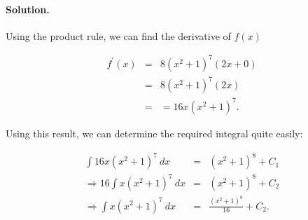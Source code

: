 
\paragraph{Solution.}

Using the product rule, we can find the derivative of $f\left(x\right)$

\begin{eqnarray*}
	f^\prime\left(x\right)&=&8\left(x^2+1\right)^7\left(2x+0\right)\\
	&=&8\left(x^2+1\right)^7\left(2x\right)\\
	&=&=16x\left(x^2+1\right)^7.
\end{eqnarray*}

Using this result, we can determine the required integral quite easily:

\begin{eqnarray*}
	\int16x\left(x^2+1\right)^7~dx&=&\left(x^2+1\right)^8+C_1\\
	\Rightarrow16\int x\left(x^2+1\right)^7~dx&=&\left(x^2+1\right)^8+C_2\\
	\Rightarrow\int x\left(x^2+1\right)^7~dx&=&\frac{\left(x^2+1\right)^8}{16}+C_2.
\end{eqnarray*}
